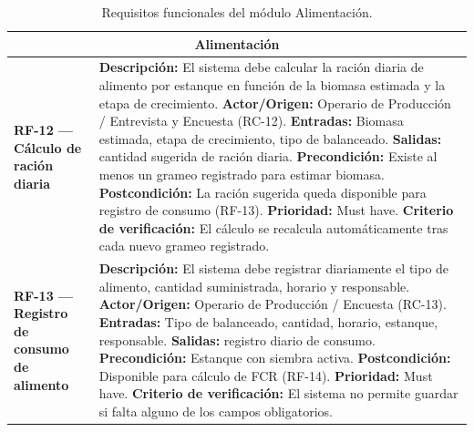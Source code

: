 \documentclass[11pt,a4paper]{article}
\begin{document}
\begin{longtable}{|p{3.5cm}|p{12cm}|}
\caption{Requisitos funcionales del módulo Alimentación.}
\label{tab:rf-alimentacion}
\hline

\multicolumn{2}{|c|}{\textbf{Alimentación}} \\ \hline

\textbf{RF-12 — Cálculo de ración diaria} &
\textbf{Descripción:} El sistema debe calcular la ración diaria de alimento por estanque en función de la biomasa estimada y la etapa de crecimiento. \newline
\textbf{Actor/Origen:} Operario de Producción / Entrevista y Encuesta (RC-12). \newline
\textbf{Entradas:} Biomasa estimada, etapa de crecimiento, tipo de balanceado. \newline
\textbf{Salidas:} cantidad sugerida de ración diaria. \newline
\textbf{Precondición:} Existe al menos un grameo registrado para estimar biomasa. \newline
\textbf{Postcondición:} La ración sugerida queda disponible para registro de consumo (RF-13). \newline
\textbf{Prioridad:} Must have. \newline
\textbf{Criterio de verificación:} El cálculo se recalcula automáticamente tras cada nuevo grameo registrado. \\ \hline

\textbf{RF-13 — Registro de consumo de alimento} &
\textbf{Descripción:} El sistema debe registrar diariamente el tipo de alimento, cantidad suministrada, horario y responsable. \newline
\textbf{Actor/Origen:} Operario de Producción / Encuesta (RC-13). \newline
\textbf{Entradas:} Tipo de balanceado, cantidad, horario, estanque, responsable. \newline
\textbf{Salidas:} registro diario de consumo. \newline
\textbf{Precondición:} Estanque con siembra activa. \newline
\textbf{Postcondición:} Disponible para cálculo de FCR (RF-14). \newline
\textbf{Prioridad:} Must have. \newline
\textbf{Criterio de verificación:} El sistema no permite guardar si falta alguno de los campos obligatorios. \\ \hline


\end{longtable}
\end{document}
